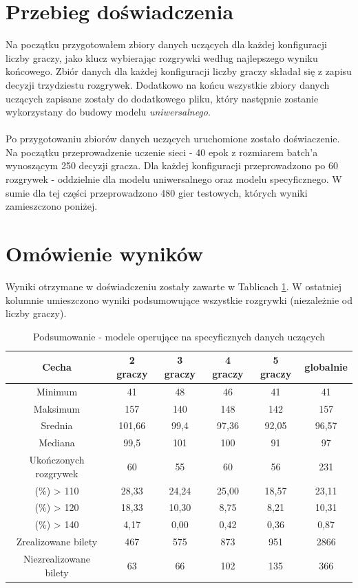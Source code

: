 \documentclass[12pt, oneside]{report}
\begin{document}
	\section{Przebieg doświadczenia}
	Na początku przygotowałem zbiory danych uczących dla każdej konfiguracji liczby graczy, jako klucz wybierając rozgrywki według najlepszego wyniku końcowego. Zbiór danych dla każdej konfiguracji liczby graczy składał się z zapisu decyzji trzydziestu rozgrywek. Dodatkowo na końcu wszystkie zbiory danych uczących zapisane zostały do dodatkowego pliku, który następnie zostanie wykorzystany do budowy modelu \textit{uniwersalnego}. \\ \\
	Po przygotowaniu zbiorów danych uczących uruchomione zostało doświaczenie. Na początku przeprowadzenie uczenie sieci - 40 epok z rozmiarem batch'a wynoszącym 250 decyzji gracza. Dla każdej konfiguracji przeprowadzono po 60 rozgrywek - oddzielnie dla modelu uniwersalnego oraz modelu specyficznego. W sumie dla tej części przeprowadzono 480 gier testowych, których wyniki zamieszczono poniżej.
	\section{Omówienie wyników}
	Wyniki otrzymane w doświadczeniu zostały zawarte w Tablicach \ref{table:nn_single_test}. W ostatniej kolumnie umieszczono wyniki podsumowujące wszystkie rozgrywki (niezależnie od liczby graczy).
	\begin{table}[h]
		\begin{center}
			\begin{tabular}{| c | c | c | c | c | c |} \hline
				Cecha & 2 graczy & 3 graczy & 4 graczy & 5 graczy & globalnie \\ \hline
				Minimum & 41 & 48 & 46 & 41 & 41 \\ \hline
				Maksimum & 157 & 140 & 148 & 142 & 157 \\ \hline
				Srednia & 101,66 & 99,4 & 97,36 & 92,05 & 96,57 \\ \hline
				Mediana & 99,5 & 101 & 100 & 91 & 97 \\ \hline
				Ukończonych rozgrywek & 60 & 55 & 60 & 56 & 231 \\ \hline
				(\%) > 110 & 28,33 & 24,24 & 25,00 & 18,57 & 23,11 \\ \hline
				(\%) > 120 & 18,33 & 10,30 & 8,75 & 8,21 & 10,31 \\ \hline
				(\%) > 140 & 4,17 & 0,00 & 0,42 & 0,36 & 0,87 \\ \hline
				Zrealizowane bilety & 467 & 575 & 873 & 951 & 2866 \\ \hline
				Niezrealizowane bilety & 63 & 66 & 102 & 135 & 366 \\ \hline
			\end{tabular}
			\caption{Podsumowanie - modele operujące na specyficznych danych uczących}
			\label{table:nn_single_test}
		\end{center}
	\end{table}
	
\end{document}
